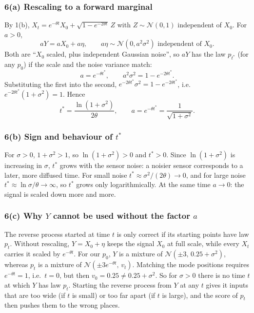 \documentclass[11pt]{article}
\newcommand{\N}{\mathcal{N}}
\begin{document}
\subsubsection*{6(a) Rescaling to a forward marginal}

By 1(b), $X_t = e^{-\theta t}X_0 + \sqrt{1-e^{-2\theta t}}\,Z$ with $Z\sim\N(0,1)$ independent of $X_0$. For $a>0$,
\[
aY = aX_0 + a\eta, \qquad a\eta\sim\N(0,a^2\sigma^2) \text{ independent of } X_0 .
\]
Both are ``$X_0$ scaled, plus independent Gaussian noise'', so $aY$ has the law $p_{t^*}$ (for any $p_0$) if the scale and the noise
variance match:
\[
a = e^{-\theta t^*}, \qquad a^2\sigma^2 = 1 - e^{-2\theta t^*} .
\]
Substituting the first into the second, $e^{-2\theta t^*}\sigma^2 = 1 - e^{-2\theta t^*}$, i.e.\ $e^{-2\theta t^*}(1+\sigma^2) = 1$. Hence
\[
\boxed{t^* = \frac{\ln(1+\sigma^2)}{2\theta}, \qquad a = e^{-\theta t^*} = \frac{1}{\sqrt{1+\sigma^2}} .}
\]

\subsubsection*{6(b) Sign and behaviour of $t^*$}

For $\sigma>0$, $1+\sigma^2>1$, so $\ln(1+\sigma^2)>0$ and $t^*>0$. Since $\ln(1+\sigma^2)$ is increasing in $\sigma$, $t^*$ grows with the sensor noise: a
noisier sensor corresponds to a later, more diffused time. For small noise $t^*\approx\sigma^2/(2\theta)\to0$, and for large noise
$t^*\approx\ln\sigma/\theta\to\infty$, so $t^*$ grows only logarithmically. At the same time $a\to0$: the signal is scaled down more and more.

\subsubsection*{6(c) Why $Y$ cannot be used without the factor $a$}

The reverse process started at time $t$ is only correct if its starting points have law $p_t$. Without rescaling, $Y = X_0 + \eta$
keeps the signal $X_0$ at full scale, while every $X_t$ carries it scaled by $e^{-\theta t}$. For our $p_0$, $Y$ is a mixture of
$\N(\pm3,\,0.25+\sigma^2)$, whereas $p_t$ is a mixture of $\N(\pm3e^{-\theta t},\,v_t)$. Matching the mode positions requires $e^{-\theta t} = 1$, i.e.\ $t=0$,
but then $v_0 = 0.25 \ne 0.25 + \sigma^2$. So for $\sigma>0$ there is no time $t$ at which $Y$ has law $p_t$. Starting the reverse process
from $Y$ at any $t$ gives it inputs that are too wide (if $t$ is small) or too far apart (if $t$ is large), and the score of $p_t$ then
pushes them to the wrong places.
\end{document}
